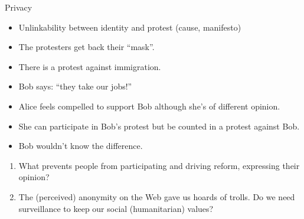 \begin{frame}
  \begin{block}{Privacy}
    \begin{itemize}
      \item Unlinkability between identity and protest (cause, manifesto)
      \item The protesters get back their \enquote{mask}.
    \end{itemize}
  \end{block}

  \begin{example}
    \begin{itemize}
      \item There is a protest against immigration.
      \item Bob says: \enquote{they take our jobs!}
      \item Alice feels compelled to support Bob although she's of different 
        opinion.
      \item She can participate in Bob's protest but be counted in a protest 
        against Bob.
      \item Bob wouldn't know the difference.
    \end{itemize}
  \end{example}
\end{frame}


\begin{frame}
  \begin{question}
    \begin{enumerate}
      \item What prevents people from participating and driving reform, 
        expressing their opinion?

      \item The (perceived) anonymity on the Web gave us hoards of trolls.
        Do we need surveillance to keep our social (humanitarian) values?
    \end{enumerate}
  \end{question}
\end{frame}


